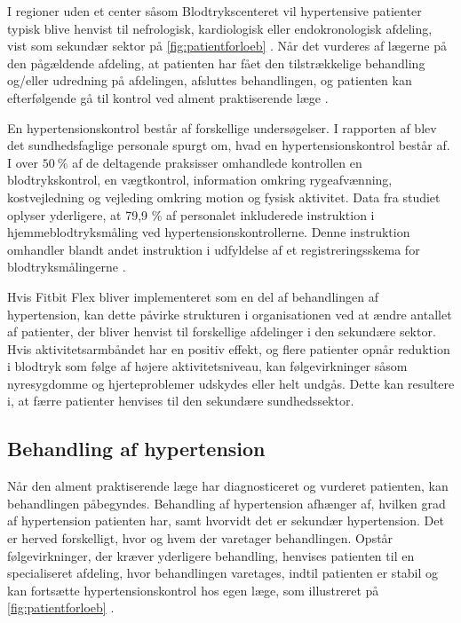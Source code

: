 I regioner uden et center såsom Blodtrykscenteret vil hypertensive patienter typisk blive henvist til nefrologisk, kardiologisk eller endokronologisk afdeling, vist som sekundær sektor på \autoref{fig:patientforloeb} \citep{buur2011}. Når det vurderes af lægerne på den pågældende afdeling, at patienten har fået den tilstrækkelige behandling og/eller udredning på afdelingen, afsluttes behandlingen, og patienten kan efterfølgende gå til kontrol ved alment praktiserende læge \citep{sundhedsstyrelsen2010, lodberg2016}.

En hypertensionskontrol består af forskellige  undersøgelser. I rapporten af \citeauthor{munck2007} blev det sundhedsfaglige personale spurgt om, hvad en  hypertensionskontrol består af. I over $50~\%$ af de deltagende praksisser omhandlede kontrollen en blodtrykskontrol, en vægtkontrol, information omkring rygeafvænning, kostvejledning og vejleding omkring motion og fysisk aktivitet. Data fra studiet oplyser yderligere, at 79,9 \% af personalet inkluderede instruktion i hjemmeblodtryksmåling ved hypertensionskontrollerne. Denne instruktion omhandler blandt andet instruktion i udfyldelse af et registreringsskema for blodtryksmålingerne \citep{munck2007}. 

Hvis Fitbit Flex bliver implementeret som en del af behandlingen af hypertension, kan dette påvirke strukturen i organisationen ved at ændre antallet af patienter, der bliver henvist til forskellige afdelinger i den sekundære sektor. Hvis aktivitetsarmbåndet har en positiv effekt, og flere patienter opnår reduktion i blodtryk som følge af højere aktivitetsniveau, kan følgevirkninger såsom nyresygdomme og hjerteproblemer udskydes eller helt undgås. Dette kan resultere i, at færre patienter henvises til den sekundære sundhedssektor. 

\subsection{Behandling af hypertension} \label{sec:beh_hypertension}

Når den alment praktiserende læge har diagnosticeret og vurderet patienten, kan behandlingen påbegyndes. Behandling af hypertension afhænger af, hvilken grad af hypertension patienten har, samt hvorvidt det er sekundær hypertension. Det er herved forskelligt, hvor og hvem der varetager behandlingen. Opstår følgevirkninger, der kræver yderligere behandling, henvises patienten til en specialiseret afdeling, hvor behandlingen varetages, indtil patienten er stabil og kan fortsætte hypertensionskontrol hos egen læge, som illustreret på \autoref{fig:patientforloeb} \citep{sundhedsstyrelsen2010}.

